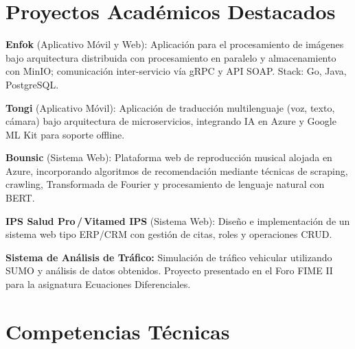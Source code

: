 \documentclass[10pt, letterpaper]{article}
\begin{document}
\section{Proyectos Acad\'emicos Destacados}

\small
\noindent\textbf{\color{darkgray}Enfok} \textcolor{midgray}{(Aplicativo M\'ovil y Web):}
\textcolor{midgray}{Aplicaci\'on para el procesamiento de im\'agenes bajo arquitectura distribuida con procesamiento en paralelo y almacenamiento con MinIO; comunicaci\'on inter-servicio v\'ia gRPC y API SOAP. Stack: Go, Java, PostgreSQL.}

\smallskip
\noindent\textbf{\color{darkgray}Tongi} \textcolor{midgray}{(Aplicativo M\'ovil):}
\textcolor{midgray}{Aplicaci\'on de traducci\'on multilenguaje (voz, texto, c\'amara) bajo arquitectura de microservicios, integrando IA en Azure y Google ML Kit para soporte offline.}

\smallskip
\noindent\textbf{\color{darkgray}Bounsic} \textcolor{midgray}{(Sistema Web):}
\textcolor{midgray}{Plataforma web de reproducci\'on musical alojada en Azure, incorporando algoritmos de recomendaci\'on mediante t\'ecnicas de scraping, crawling, Transformada de Fourier y procesamiento de lenguaje natural con BERT.}

\smallskip
\noindent\textbf{\color{darkgray}IPS Salud Pro\,/\,Vitamed IPS} \textcolor{midgray}{(Sistema Web):}
\textcolor{midgray}{Dise\~no e implementaci\'on de un sistema web tipo ERP/CRM con gesti\'on de citas, roles y operaciones CRUD.}

\smallskip
\noindent\textbf{\color{darkgray}Sistema de An\'alisis de Tr\'afico:}
\textcolor{midgray}{Simulaci\'on de tr\'afico vehicular utilizando SUMO y an\'alisis de datos obtenidos. Proyecto presentado en el Foro FIME II para la asignatura Ecuaciones Diferenciales.}
\normalsize

\section{Competencias T\'ecnicas}
\end{document}
